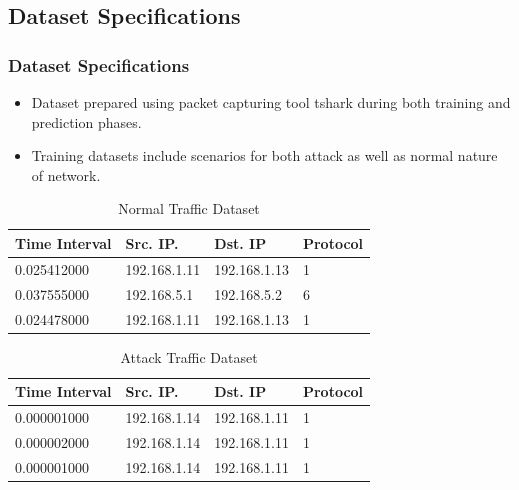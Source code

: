 \documentclass[10pt]{beamer}
\begin{document}
\begin{frame}
\section[]{Dataset Specifications}
\frametitle{Dataset Specifications}
\begin{itemize}
\footnotesize
\item
Dataset prepared using packet capturing tool tshark during both training and prediction phases.

\item
Training datasets include scenarios for both attack as well as normal nature of network.
\end{itemize}

\begin{table}
\scriptsize
\begin{center}
\begin{tabular}{ | m{1.5cm} | m{1.5cm}| m{1.5cm} | m{1cm} |} 
\hline
\textbf{Time Interval} & \textbf{Src. IP.} & \textbf{Dst. IP} & \textbf{Protocol} \\
\hline
0.025412000 & 192.168.1.11 & 192.168.1.13 & 1 \\
\hline
0.037555000 & 192.168.5.1 & 192.168.5.2 & 6 \\
\hline
0.024478000 & 192.168.1.11 & 192.168.1.13 & 1 \\
\hline
\end{tabular}
\end{center}
\caption{\footnotesize Normal Traffic Dataset}
\end{table}

\begin{table}
\scriptsize
\begin{center}
\begin{tabular}{ | m{1.5cm} | m{1.5cm}| m{1.5cm} | m{1cm} |} 
\hline
\textbf{Time Interval} & \textbf{Src. IP.} & \textbf{Dst. IP} & \textbf{Protocol} \\
\hline
0.000001000 & 192.168.1.14 & 192.168.1.11 & 1 \\
\hline
0.000002000 & 192.168.1.14 & 192.168.1.11 & 1 \\
\hline
0.000001000 & 192.168.1.14 & 192.168.1.11 & 1 \\
\hline
\end{tabular}
\end{center}
\caption{\footnotesize Attack Traffic Dataset}
\end{table}
\end{frame}
\end{document}
